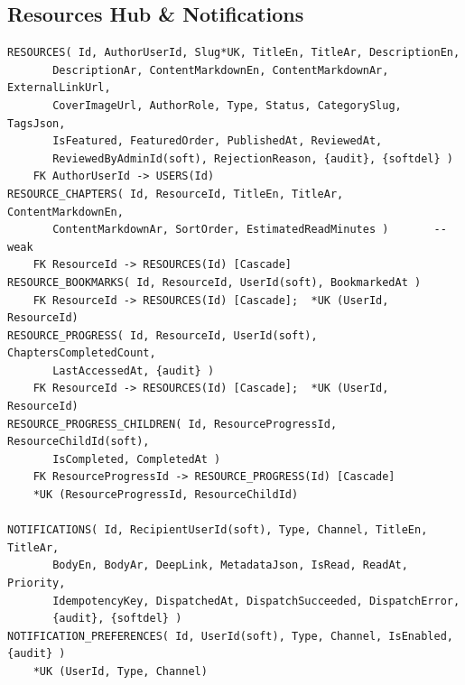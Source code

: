 \documentclass[11pt,a4paper]{article}
\begin{document}
\subsection{Resources Hub \& Notifications}
{\footnotesize\begin{verbatim}
RESOURCES( Id, AuthorUserId, Slug*UK, TitleEn, TitleAr, DescriptionEn,
       DescriptionAr, ContentMarkdownEn, ContentMarkdownAr, ExternalLinkUrl,
       CoverImageUrl, AuthorRole, Type, Status, CategorySlug, TagsJson,
       IsFeatured, FeaturedOrder, PublishedAt, ReviewedAt,
       ReviewedByAdminId(soft), RejectionReason, {audit}, {softdel} )
    FK AuthorUserId -> USERS(Id)
RESOURCE_CHAPTERS( Id, ResourceId, TitleEn, TitleAr, ContentMarkdownEn,
       ContentMarkdownAr, SortOrder, EstimatedReadMinutes )       -- weak
    FK ResourceId -> RESOURCES(Id) [Cascade]
RESOURCE_BOOKMARKS( Id, ResourceId, UserId(soft), BookmarkedAt )
    FK ResourceId -> RESOURCES(Id) [Cascade];  *UK (UserId, ResourceId)
RESOURCE_PROGRESS( Id, ResourceId, UserId(soft), ChaptersCompletedCount,
       LastAccessedAt, {audit} )
    FK ResourceId -> RESOURCES(Id) [Cascade];  *UK (UserId, ResourceId)
RESOURCE_PROGRESS_CHILDREN( Id, ResourceProgressId, ResourceChildId(soft),
       IsCompleted, CompletedAt )
    FK ResourceProgressId -> RESOURCE_PROGRESS(Id) [Cascade]
    *UK (ResourceProgressId, ResourceChildId)

NOTIFICATIONS( Id, RecipientUserId(soft), Type, Channel, TitleEn, TitleAr,
       BodyEn, BodyAr, DeepLink, MetadataJson, IsRead, ReadAt, Priority,
       IdempotencyKey, DispatchedAt, DispatchSucceeded, DispatchError,
       {audit}, {softdel} )
NOTIFICATION_PREFERENCES( Id, UserId(soft), Type, Channel, IsEnabled, {audit} )
    *UK (UserId, Type, Channel)
\end{verbatim}}
\end{document}
